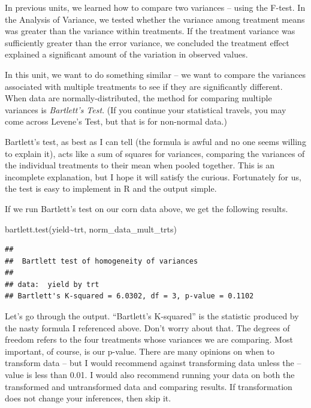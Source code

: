 \documentclass[
]{book}
\newenvironment{Shaded}{\begin{snugshade}}{\end{snugshade}}
\newcommand{\FunctionTok}[1]{\textcolor[rgb]{0.00,0.00,0.00}{#1}}
\newcommand{\NormalTok}[1]{#1}
\newcommand{\SpecialCharTok}[1]{\textcolor[rgb]{0.00,0.00,0.00}{#1}}
\begin{document}
In previous units, we learned how to compare two variances -- using the F-test. In the Analysis of Variance, we tested whether the variance among treatment means was greater than the variance within treatments. If the treatment variance was sufficiently greater than the error variance, we concluded the treatment effect explained a significant amount of the variation in observed values.

In this unit, we want to do something similar -- we want to compare the variances associated with multiple treatments to see if they are significantly different. When data are normally-distributed, the method for comparing multiple variances is \emph{Bartlett's Test}. (If you continue your statistical travels, you may come across Levene's Test, but that is for non-normal data.)

Bartlett's test, as best as I can tell (the formula is awful and no one seems willing to explain it), acts like a sum of squares for variances, comparing the variances of the individual treatments to their mean when pooled together. This is an incomplete explanation, but I hope it will satisfy the curious. Fortunately for us, the test is easy to implement in R and the output simple.

If we run Bartlett's test on our corn data above, we get the following results.

\begin{Shaded}
\begin{Highlighting}[]
\FunctionTok{bartlett.test}\NormalTok{(yield}\SpecialCharTok{\textasciitilde{}}\NormalTok{trt, norm\_data\_mult\_trts)}
\end{Highlighting}
\end{Shaded}

\begin{verbatim}
## 
##  Bartlett test of homogeneity of variances
## 
## data:  yield by trt
## Bartlett's K-squared = 6.0302, df = 3, p-value = 0.1102
\end{verbatim}

Let's go through the output. ``Bartlett's K-squared'' is the statistic produced by the nasty formula I referenced above. Don't worry about that. The degrees of freedom refers to the four treatments whose variances we are comparing. Most important, of course, is our p-value. There are many opinions on when to transform data -- but I would recommend against transforming data unless the --value is less than 0.01. I would also recommend running your data on both the transformed and untransformed data and comparing results. If transformation does not change your inferences, then skip it.
\end{document}
